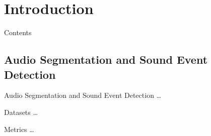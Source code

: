 

\section[Introduction]{Introduction}

	\begin{frame}{Contents}
			
		\tableofcontents
		
		\note{
			\dots			
		}		
		
	\end{frame}
	
	\subsection[Audio Segmentation and Sound Event Detection]{Audio Segmentation and Sound Event Detection}
	\begin{frame}{Audio Segmentation and Sound Event Detection}
		\dots		
		
		\note{
			\dots
		}
	\end{frame}
	
	\begin{frame}{Datasets}
		\dots		
		
		\note{
			\dots
		}
	\end{frame}
	
	\begin{frame}{Metrics}
		\dots		
		
		\note{
			\dots
		}
	\end{frame}